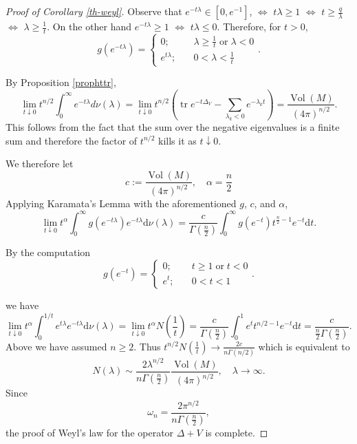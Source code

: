 \documentclass[letterpaper,12pt]{amsart}
\newcommand{\tr}{\mathop{\mathrm{tr}}}
\newcommand{\Vol}{\operatorname{Vol}}
\begin{document}
\begin{proof}[Proof of Corollary \ref{th-weyl}]
Observe that $e^{-t\lambda} \in \left[0,e^{-1}\right]$, $\Leftrightarrow$ $t\lambda \geq 1$ $\Leftrightarrow$ $t\geq \frac q \lambda$ $\Leftrightarrow$ $\lambda \geq \frac 1 t$. On the other hand $e^{-t\lambda} \geq 1$ $\Leftrightarrow$ $t\lambda \leq 0$. Therefore, for $t >0$,
\begin{equation*}  
g\left(e^{-t\lambda}\right) = \left\{ \begin{array}{ll} 0; &\quad \lambda \geq \frac 1 t \;\mathrm{or}\;\lambda < 0 \\ e^{t\lambda}; &\quad 0 <\lambda < \frac 1 t\end{array}\right..
\end{equation*}

By Proposition \ref{prophttr},
$$\lim_{t \downarrow 0} t^{n/2} \int_0 ^\infty e^{-t \lambda} d\nu(\lambda) = \lim_{t\downarrow 0} t^{n/2}\left( \tr e^{-t\Delta_V} - \sum_{\lambda_k < 0} e^{-\lambda_k t} \right)= \frac{ \Vol(M)}{(4\pi)^{n/2}}.$$
This follows from the fact that the sum over the negative eigenvalues is a finite sum and therefore the factor of $t^{n/2}$ kills it as $t \downarrow 0$.

We therefore let
$$c :=  \frac{ \Vol(M)}{(4\pi)^{n/2}}, \quad \alpha = \frac{n}{2}$$
Applying Karamata's Lemma with the aforementioned $g$, $c$, and $\alpha$,
\begin{equation*}
\lim_{t\downarrow 0} t^\alpha \int_0^\infty g\left(e^{-t\lambda}\right) e^{-t\lambda} \mathrm d\nu(\lambda) = \frac{c}{\Gamma\left(\frac n 2\right)} \int_0^\infty g\left(e^{-t}\right) t^{\frac n 2 -1} e^{-t} \mathrm dt.
\end{equation*}

By the computation
\begin{equation*} \label{form_f}
g\left(e^{-t }\right) = \left\{ \begin{array}{ll} 0; &\quad t \geq 1 \;\mathrm{or}\; t < 0 \\ e^{t }; &\quad 0 < t <  1 \end{array}\right..
\end{equation*}



we have
\begin{equation*}
\lim_{t \downarrow 0} t^\alpha \int_0^{1/t} e^{t\lambda} e^{-t\lambda} \mathrm d\nu(\lambda) = \lim_{t \downarrow 0} t^\alpha N\left(\frac 1 t\right) = \frac{c}{\Gamma\left(\frac n 2\right)}\int_0^1 e^t t^{n/2-1} e^{-t} \mathrm dt = \frac{c}{\frac{n}{2}\Gamma\left(\frac{n}{2}\right)}.
\end{equation*}
Above we have assumed $n\geq 2$. Thus $t^{n/2} N\left(\frac{1}{t}\right) \to \frac{2c}{n\Gamma(n/2)}$ which is equivalent to
\begin{equation*}
N(\lambda) \sim \frac{2\lambda^{n/2}}{n\Gamma\left(\frac{n}{2}\right)}\frac{\Vol(M)}{(4\pi)^{n/2}}, \quad \lambda \to \infty.
\end{equation*}
 Since
 $$\omega_n = \frac{2 \pi^{n/2}}{n \Gamma\left( \frac n 2 \right)},$$
 the proof of Weyl's law for the operator $\Delta + V$ is complete.


\end{proof}
\end{document}

